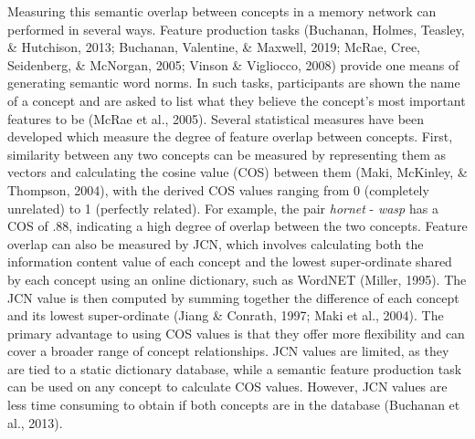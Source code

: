 \documentclass[english,,man]{apa6}
\begin{document}
Measuring this semantic overlap between concepts in a memory network can performed in several ways. Feature production tasks (Buchanan, Holmes, Teasley, \& Hutchison, 2013; Buchanan, Valentine, \& Maxwell, 2019; McRae, Cree, Seidenberg, \& McNorgan, 2005; Vinson \& Vigliocco, 2008) provide one means of generating semantic word norms. In such tasks, participants are shown the name of a concept and are asked to list what they believe the concept's most important features to be (McRae et al., 2005). Several statistical measures have been developed which measure the degree of feature overlap between concepts. First, similarity between any two concepts can be measured by representing them as vectors and calculating the cosine value (COS) between them (Maki, McKinley, \& Thompson, 2004), with the derived COS values ranging from 0 (completely unrelated) to 1 (perfectly related). For example, the pair \emph{hornet} - \emph{wasp} has a COS of .88, indicating a high degree of overlap between the two concepts. Feature overlap can also be measured by JCN, which involves calculating both the information content value of each concept and the lowest super-ordinate shared by each concept using an online dictionary, such as WordNET (Miller, 1995). The JCN value is then computed by summing together the difference of each concept and its lowest super-ordinate (Jiang \& Conrath, 1997; Maki et al., 2004). The primary advantage to using COS values is that they offer more flexibility and can cover a broader range of concept relationships. JCN values are limited, as they are tied to a static dictionary database, while a semantic feature production task can be used on any concept to calculate COS values. However, JCN values are less time consuming to obtain if both concepts are in the database (Buchanan et al., 2013).
\end{document}
